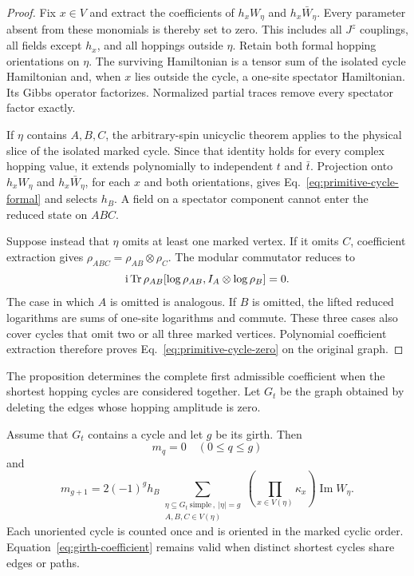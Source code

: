 \begin{proof}
Fix $x\in V$ and extract the coefficients of $h_xW_\eta$ and
$h_x\bar W_\eta$.  Every parameter absent from these monomials is thereby set
to zero.  This includes all $J^z$ couplings, all fields except $h_x$, and all
hoppings outside $\eta$.  Retain both formal hopping orientations on $\eta$.
The surviving Hamiltonian is a tensor sum of the isolated cycle
Hamiltonian and, when $x$ lies outside the cycle, a one-site spectator
Hamiltonian.  Its Gibbs operator factorizes.  Normalized partial traces
remove every spectator factor exactly.

If $\eta$ contains $A,B,C$, the arbitrary-spin unicyclic theorem applies to
the physical slice of the isolated marked cycle.  Since that identity holds
for every complex hopping value, it extends polynomially to independent
$t$ and $\bar t$.  Projection onto $h_xW_\eta$ and $h_x\bar W_\eta$, for
each $x$ and both orientations, gives
Eq.~\eqref{eq:primitive-cycle-formal} and selects $h_B$.  A field on a
spectator component cannot enter the reduced state on $ABC$.

Suppose instead that $\eta$ omits at least one marked vertex.  If it omits
$C$, coefficient extraction gives
$\rho_{ABC}=\rho_{AB}\otimes\rho_C$.  The modular commutator reduces to
\begin{equation*}
 \mathrm{i}\operatorname{Tr}\rho_{AB}
 [\log\rho_{AB},I_A\otimes\log\rho_B]=0.
\end{equation*}
The case in which $A$ is omitted is analogous.  If $B$ is omitted, the
lifted reduced logarithms are sums of one-site logarithms and commute.  These
three cases also cover cycles that omit two or all three marked vertices.
Polynomial coefficient extraction therefore proves
Eq.~\eqref{eq:primitive-cycle-zero} on the original graph.
\end{proof}

The proposition determines the complete first admissible coefficient when the
shortest hopping cycles are considered together.  Let $G_t$ be the graph
obtained by deleting the edges whose hopping amplitude is zero.

\begin{corollary}
\label{cor:girth-onset}
Assume that $G_t$ contains a cycle and let $g$ be its girth.  Then
\begin{equation}
 m_q=0\quad(0\leq q\leq g)
 \label{eq:girth-lower-zero}
\end{equation}
and
\begin{equation}
 \boxed{
 m_{g+1}=2(-1)^g h_B
 \sum_{\substack{\eta\subseteq G_t\ \mathrm{simple}\,,\ |\eta|=g\\
                   A,B,C\in V(\eta)}}
 \left(\prod_{x\in V(\eta)}\kappa_x\right)
 \operatorname{Im}W_\eta .}
 \label{eq:girth-coefficient}
\end{equation}
Each unoriented cycle is counted once and is oriented in the marked cyclic
order.  Equation~\eqref{eq:girth-coefficient} remains valid when distinct
shortest cycles share edges or paths.
\end{corollary}

